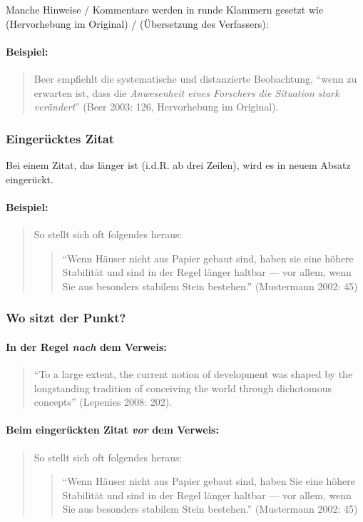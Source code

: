 \documentclass[ 12pt,
                titlepage,
                parskip=half,
                version=first,
                bibliography=totocnumbered,
                final,
                listof=totoc]{scrartcl}
\begin{document}
Manche Hinweise / Kommentare werden in runde Klammern gesetzt wie (Hervorhebung
im Original) / (Übersetzung des Verfassers):

\paragraph{Beispiel:}
\begin{quote}
Beer empfiehlt die systematische und distanzierte Beobachtung, \enquote{wenn zu
erwarten ist, dass die \emph{Anwesenheit eines Forschers die Situation stark
verändert}} (Beer 2003: 126, Hervorhebung im Original).
\end{quote}

\subsubsection{Eingerücktes Zitat}

Bei einem Zitat, das länger ist (i.d.R. ab drei Zeilen), wird es in neuem Absatz
eingerückt.

\paragraph{Beispiel:}
\begin{quote}
So stellt sich oft folgendes heraus:
\begin{quote}
\enquote{Wenn Häuser nicht aus Papier gebaut sind, haben sie eine höhere
Stabilität und sind in der Regel länger haltbar --- vor allem, wenn Sie aus
besonders stabilem Stein bestehen.} (Mustermann 2002: 45)
\end{quote}
\end{quote}

\subsubsection{Wo sitzt der Punkt?}

\paragraph{In der Regel \emph{nach} dem Verweis:}
\begin{quote}
\enquote{To a large extent, the current notion of development was shaped by the
longstanding tradition of conceiving the world through dichotomous concepts}
(Lepenies 2008: 202).
\end{quote}

\paragraph{Beim eingerückten Zitat \emph{vor} dem Verweis:}
\begin{quote}
So stellt sich oft folgendes heraus:
\begin{quote}
\enquote{Wenn Häuser nicht aus Papier gebaut sind, haben Sie eine höhere
Stabilität und sind in der Regel länger haltbar --- vor allem, wenn Sie aus
besonders stabilem Stein bestehen.} (Mustermann 2002: 45)
\end{quote}
\end{quote}
\end{document}

